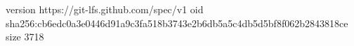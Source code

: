 version https://git-lfs.github.com/spec/v1
oid sha256:cb6edc0a3e0446d91a9c3fa518b3743e2b6db5a5c4db5d5bf8f062b2843818ce
size 3718
